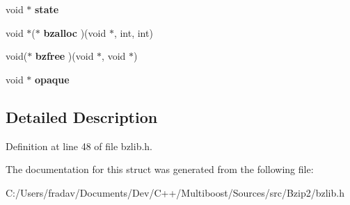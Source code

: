 \begin{DoxyCompactItemize}
\item 
\hypertarget{structbz__stream_a7b976d082aba4d851eea25a308d96ee8}{void $\ast$ {\bfseries state}}\label{structbz__stream_a7b976d082aba4d851eea25a308d96ee8}

\item 
\hypertarget{structbz__stream_ac3032f7dc55a481047e436892ac5199d}{void $\ast$($\ast$ {\bfseries bzalloc} )(void $\ast$, int, int)}\label{structbz__stream_ac3032f7dc55a481047e436892ac5199d}

\item 
\hypertarget{structbz__stream_a71c2bc381f011bebd32462975c4b75cb}{void($\ast$ {\bfseries bzfree} )(void $\ast$, void $\ast$)}\label{structbz__stream_a71c2bc381f011bebd32462975c4b75cb}

\item 
\hypertarget{structbz__stream_a8e000913c058c83abd1ec96c6aef302a}{void $\ast$ {\bfseries opaque}}\label{structbz__stream_a8e000913c058c83abd1ec96c6aef302a}

\end{DoxyCompactItemize}


\subsection{Detailed Description}


Definition at line 48 of file bzlib.\-h.



The documentation for this struct was generated from the following file\-:\begin{DoxyCompactItemize}
\item 
C\-:/\-Users/fradav/\-Documents/\-Dev/\-C++/\-Multiboost/\-Sources/src/\-Bzip2/bzlib.\-h\end{DoxyCompactItemize}
